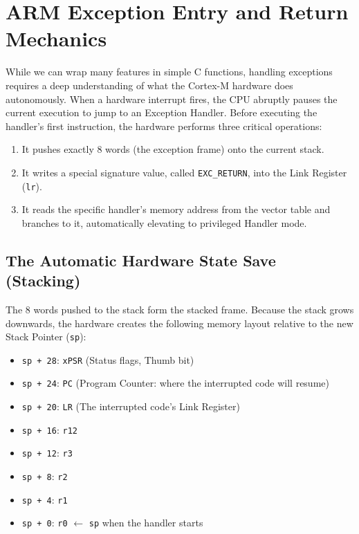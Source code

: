 \section{ARM Exception Entry and Return Mechanics}
While we can wrap many features in simple C functions, handling exceptions requires a deep understanding of what the Cortex-M hardware does autonomously. When a hardware interrupt fires, the CPU abruptly pauses the current execution to jump to an Exception Handler. Before executing the handler's first instruction, the hardware performs three critical operations:
\begin{enumerate}
    \item It pushes exactly 8 words (the exception frame) onto the current stack.
    \item It writes a special signature value, called \texttt{EXC\_RETURN}, into the Link Register (\texttt{lr}).
    \item It reads the specific handler's memory address from the vector table and branches to it, automatically elevating to privileged Handler mode.
\end{enumerate}

\subsection{The Automatic Hardware State Save (Stacking)}
The 8 words pushed to the stack form the stacked frame. Because the stack grows downwards, the hardware creates the following memory layout relative to the new Stack Pointer (\texttt{sp}):
\begin{itemize}
    \item \texttt{sp + 28}: \texttt{xPSR} (Status flags, Thumb bit)
    \item \texttt{sp + 24}: \texttt{PC} (Program Counter: where the interrupted code will resume)
    \item \texttt{sp + 20}: \texttt{LR} (The interrupted code's Link Register)
    \item \texttt{sp + 16}: \texttt{r12}
    \item \texttt{sp + 12}: \texttt{r3}
    \item \texttt{sp +  8}: \texttt{r2}
    \item \texttt{sp +  4}: \texttt{r1}
    \item \texttt{sp +  0}: \texttt{r0} $\leftarrow$ \texttt{sp} when the handler starts
\end{itemize}

